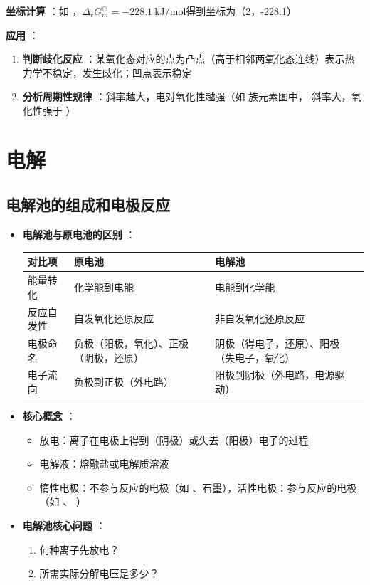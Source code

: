 \textbf{坐标计算} ：如  ，\( \Delta_r G_m^\ominus = \qty{-228.1}{\kilo\joule\per\mol}  \)得到坐标为（2，-228.1）

\textbf{应用} ：
\begin{enumerate} 
    \item \textbf{判断歧化反应} ：某氧化态对应的点为凸点（高于相邻两氧化态连线）表示热力学不稳定，发生歧化；凹点表示稳定
    \item \textbf{分析周期性规律} ：斜率越大，电对氧化性越强（如  族元素图中，  斜率大，氧化性强于  ）
\end{enumerate} 

\section{电解} 

\subsection{电解池的组成和电极反应} 
\begin{itemize} 
    \item \textbf{电解池与原电池的区别} ：
    \begin{table} [h]
        \centering
        \begin{tabular}{p{} p{} p{} } 
            \hline
            对比项 & 原电池 & 电解池 \\
            \hline
            能量转化 & 化学能到电能 & 电能到化学能 \\
            反应自发性 & 自发氧化还原反应 & 非自发氧化还原反应 \\
            电极命名 & 负极（阳极，氧化）、正极（阴极，还原） & 阴极（得电子，还原）、阳极（失电子，氧化） \\
            电子流向 & 负极到正极（外电路） & 阳极到阴极（外电路，电源驱动） \\
            \hline
        \end{tabular} 
    \end{table} 
    
    \item \textbf{核心概念} ：
    \begin{itemize} 
        \item 放电：离子在电极上得到（阴极）或失去（阳极）电子的过程
        \item 电解液：熔融盐或电解质溶液
        \item 惰性电极：不参与反应的电极（如  、石墨），活性电极：参与反应的电极（如  、  ）
    \end{itemize} 
    
    \item \textbf{电解池核心问题} ：
    \begin{enumerate} 
        \item 何种离子先放电？
        \item 所需实际分解电压是多少？
    \end{enumerate} 
\end{itemize} 

